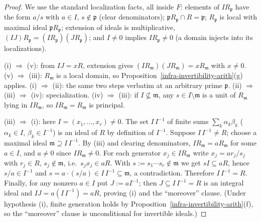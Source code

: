 \begin{proof}
  We use the standard localization facts, all inside $F$: elements of
  $I R_{\mathfrak{p}}$ have the form $a/s$ with $a \in I$, $s \notin \mathfrak{p}$
  (clear denominators); $\mathfrak{p} R_{\mathfrak{p}} \cap R = \mathfrak{p}$;
  $R_{\mathfrak{p}}$ is local with maximal ideal $\mathfrak{p} R_{\mathfrak{p}}$;
  extension of ideals is multiplicative,
  $(IJ) R_{\mathfrak{p}} = (I R_{\mathfrak{p}})(J R_{\mathfrak{p}})$; and
  $I \neq 0$ implies $I R_{\mathfrak{p}} \neq 0$ (a domain injects into its
  localizations).

  (i) $\Rightarrow$ (v): from $IJ = xR$, extension gives
  $(I R_{\mathfrak{m}})(J R_{\mathfrak{m}}) = x R_{\mathfrak{m}}$ with
  $x \neq 0$.
  (v) $\Rightarrow$ (iii): $R_{\mathfrak{m}}$ is a local domain, so
  Proposition~\ref{infra-invertibility-arith}(g) applies.
  (i) $\Rightarrow$ (ii): the same two steps verbatim at an arbitrary prime
  $\mathfrak{p}$.
  (ii) $\Rightarrow$ (iii) $\Rightarrow$ (iv): specialization.
  (iv) $\Rightarrow$ (iii): if $I \not\subseteq \mathfrak{m}$, any
  $s \in I \setminus \mathfrak{m}$ is a unit of $R_{\mathfrak{m}}$ lying in
  $I R_{\mathfrak{m}}$, so $I R_{\mathfrak{m}} = R_{\mathfrak{m}}$ is principal.

  (iii) $\Rightarrow$ (i): here $I = (x_1, \dots, x_r) \neq 0$. The set
  $I \, I^{-1}$ of finite sums $\sum_k \alpha_k \beta_k$
  ($\alpha_k \in I$, $\beta_k \in I^{-1}$) is an ideal of $R$ by definition of
  $I^{-1}$. Suppose $I \, I^{-1} \neq R$; choose a maximal ideal
  $\mathfrak{m} \supseteq I \, I^{-1}$. By (iii) and clearing denominators,
  $I R_{\mathfrak{m}} = a R_{\mathfrak{m}}$ for some $a \in I$, and $a \neq 0$
  since $I R_{\mathfrak{m}} \neq 0$. For each generator
  $x_j \in I R_{\mathfrak{m}}$ write $x_j = a r_j / s_j$ with $r_j \in R$,
  $s_j \notin \mathfrak{m}$, i.e.\ $s_j x_j \in aR$. With
  $s := s_1 \cdots s_r \notin \mathfrak{m}$ we get $s I \subseteq a R$, hence
  $s/a \in I^{-1}$ and
  $s = a \cdot (s/a) \in I \, I^{-1} \subseteq \mathfrak{m}$, a contradiction.
  Therefore $I \, I^{-1} = R$. Finally, for any nonzero $a \in I$ put
  $J := a I^{-1}$; then $J \subseteq I \, I^{-1} = R$ is an integral ideal and
  $I J = a (I \, I^{-1}) = a R$, proving (i) and the ``moreover'' clause.
  (Under hypothesis (i), finite generation holds by
  Proposition~\ref{infra-invertibility-arith}(f), so the ``moreover'' clause is
  unconditional for invertible ideals.)
\end{proof}

